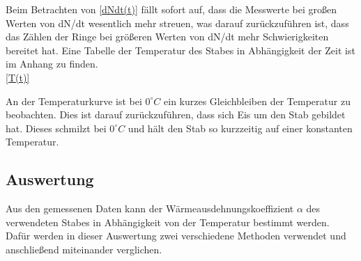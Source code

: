 Beim Betrachten von \ref{dNdt(t)} fällt sofort auf, dass die Messwerte bei großen Werten von dN/dt wesentlich mehr streuen, was darauf zurückzuführen ist, dass das Zählen der Ringe bei größeren Werten von dN/dt mehr Schwierigkeiten bereitet hat.
Eine Tabelle der Temperatur des Stabes in Abhängigkeit der Zeit ist im Anhang zu finden. \\
\ref{T(t)}

An der Temperaturkurve ist bei $ 0 ^{\circ} C $ ein kurzes Gleichbleiben der Temperatur zu beobachten. Dies ist darauf zurückzuführen, dass sich Eis um den Stab gebildet hat. Dieses schmilzt bei $ 0 ^{\circ} C $ und hält den Stab so kurzzeitig auf einer konstanten Temperatur.

\subsection{Auswertung}
Aus den gemessenen Daten kann der Wärmeausdehnungskoeffizient $ \alpha $ des verwendeten Stabes in Abhängigkeit von der Temperatur bestimmt werden. Dafür werden in dieser Auswertung zwei verschiedene Methoden verwendet und anschließend miteinander verglichen.

